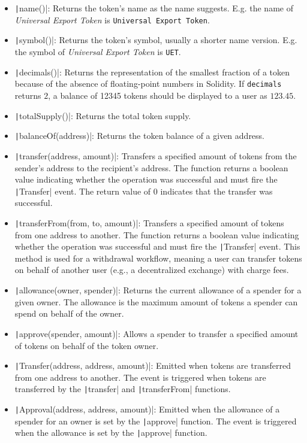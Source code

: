 \begin{itemize}
    \item \texttt|name()|: Returns the token's name as the name suggests. E.g. the name of \textit{Universal Export Token} is \texttt{Universal Export Token}.
    \item \texttt|symbol()|: Returns the token's symbol, usually a shorter name version. E.g. the symbol of \textit{Universal Export Token} is \texttt{UET}.
    \item \texttt|decimals()|: Returns the representation of the smallest fraction of a token because of the absence of floating-point numbers in Solidity. If \texttt{decimals} returns $2$, 
    a balance of 12345 tokens should be displayed to a user as $123.45$.
    \item \texttt|totalSupply()|: Returns the total token supply.
    \item \texttt|balanceOf(address)|: Returns the token balance of a given address.
    \item \texttt|transfer(address, amount)|: Transfers a specified amount of tokens from the sender's address to the recipient's address. The function returns a boolean
          value indicating whether the operation was successful and must fire the \texttt|Transfer| event. The return value of 0 indicates that the transfer was successful.
    \item \texttt|transferFrom(from, to, amount)|: Transfers a specified amount of tokens from one address to another. The function returns a boolean value
          indicating whether the operation was successful and must fire the \texttt|Transfer| event. This method is used for a withdrawal workflow,
          meaning a user can transfer tokens on behalf of another user (e.g., a decentralized exchange) with charge fees.
    \item \texttt|allowance(owner, spender)|: Returns the current allowance of a spender for a given owner. The allowance is the maximum amount of tokens a spender can spend on behalf of the owner.
    \item \texttt|approve(spender, amount)|: Allows a spender to transfer a specified amount of tokens on behalf of the token owner.
    \item \texttt|Transfer(address, address, amount)|: Emitted when tokens are transferred from one address to another. The event is triggered when tokens are transferred by the \texttt|transfer| and \texttt|transferFrom| functions.
    \item \texttt|Approval(address, address, amount)|: Emitted when the allowance of a spender for an owner is set by the \texttt|approve| function. The event is triggered when the allowance is set by the \texttt|approve| function.
\end{itemize}

